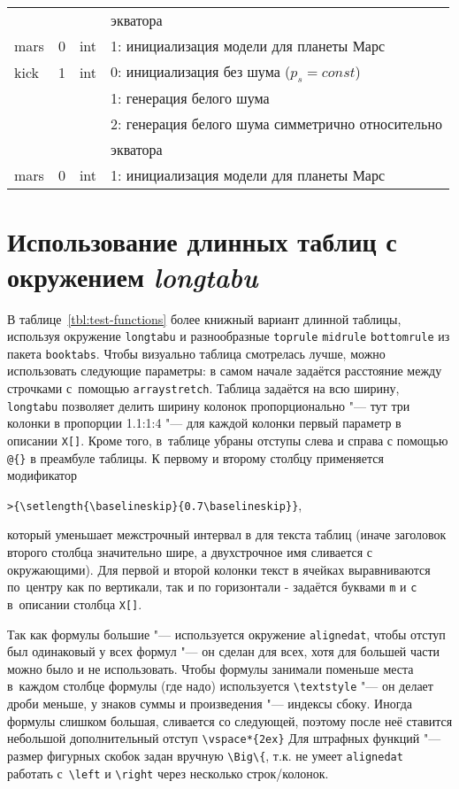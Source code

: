 \begin{longtable}[c]{|l|c|l|l|}
      & & & экватора    \\
     mars & 0 & int & 1: инициализация модели для планеты Марс     \\
    kick & 1 & int & 0: инициализация без шума ($p_s = const$) \\
          &   &     & 1: генерация белого шума                  \\
          &   &     & 2: генерация белого шума симметрично относительно \\
      & & & экватора    \\
     mars & 0 & int & 1: инициализация модели для планеты Марс     \\ 
    \end{longtable}
\normalsize%
\endgroup
\section{Использование длинных таблиц с окружением \textit{longtabu}} \label{AppendixB2a}

В таблице~\ref{tbl:test-functions} более книжный вариант 
длинной таблицы, используя окружение \verb!longtabu! и разнообразные
\verb!toprule! \verb!midrule! \verb!bottomrule! из пакета
\verb!booktabs!. Чтобы визуально таблица смотрелась лучше, можно
использовать следующие параметры: в самом начале задаётся расстояние
между строчками с~помощью \verb!arraystretch!. Таблица задаётся на
всю ширину, \verb!longtabu! позволяет делить ширину колонок
пропорционально "--- тут три колонки в пропорции 1.1:1:4 "--- для каждой
колонки первый параметр в описании \verb!X[]!. Кроме того, в~таблице
убраны отступы слева и справа с помощью \verb!@{}! в
преамбуле таблицы. К первому и второму столбцу применяется
модификатор 

\verb!>{\setlength{\baselineskip}{0.7\baselineskip}}!,

\noindent который уменьшает межстрочный интервал в для текста таблиц (иначе
заголовок второго столбца значительно шире, а двухстрочное имя
сливается с окружающими). Для первой и второй колонки текст в ячейках
выравниваются по~центру как по вертикали, так и по горизонтали -
задаётся буквами \verb!m! и \verb!c! в~описании столбца \verb!X[]!. 

Так как формулы большие "--- используется окружение \verb!alignedat!,
чтобы отступ был одинаковый у всех формул "--- он сделан для всех, хотя
для большей части можно было и не использовать.  Чтобы формулы
занимали поменьше места в~каждом столбце формулы (где надо)
используется \verb!\textstyle! "--- он делает дроби меньше, у знаков
суммы и произведения "--- индексы сбоку. Иногда формулы слишком большая,
сливается со следующей, поэтому после неё ставится небольшой
дополнительный отступ \verb!\vspace*{2ex}!  Для штрафных функций "---
размер фигурных скобок задан вручную \verb!\Big\{!, т.к. не умеет
\verb!alignedat! работать с~\verb!\left! и \verb!\right! через
несколько строк/колонок.


